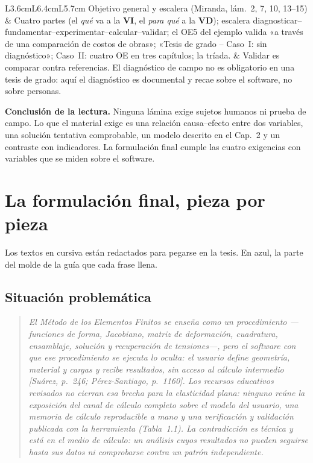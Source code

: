 \documentclass[11pt,a4paper]{article}
\newcommand{\vi}{\textbf{VI}}
\newcommand{\vd}{\textbf{VD}}
\newcommand{\molde}[1]{\textcolor{blue!60!black}{\small #1}}
\newcommand{\pegar}[1]{\begin{quote}\itshape #1\end{quote}}
\begin{document}
{\begin{longtable}{L{3.6cm}L{6.4cm}L{5.7cm}}
Objetivo general y escalera (Miranda, lám.~2, 7, 10, 13--15) & Cuatro partes (el \emph{qué} va a la \vi, el \emph{para qué} a la \vd); escalera diagnosticar--fundamentar--experimentar--calcular--validar; el OE5 del ejemplo valida «a través de una comparación de costos de obras»; «Tesis de grado -- Caso~I: sin diagnóstico»; Caso~II: cuatro OE en tres capítulos; la tríada. & Validar es comparar contra referencias. El diagnóstico de campo no es obligatorio en una tesis de grado: aquí el diagnóstico es documental y recae sobre el software, no sobre personas. \\
\bottomrule
\end{longtable}}

\textbf{Conclusión de la lectura.} Ninguna lámina exige sujetos humanos ni prueba de campo. Lo que el material exige es una relación causa--efecto entre dos variables, una solución tentativa comprobable, un modelo descrito en el Cap.~2 y un contraste con indicadores. La formulación final cumple las cuatro exigencias con variables que se miden sobre el software.

\section{La formulación final, pieza por pieza}
\label{sec:formulacion}

Los textos en cursiva están redactados para pegarse en la tesis. \molde{En azul, la parte del molde de la guía que cada frase llena.}

\subsection{Situación problemática}

\pegar{El Método de los Elementos Finitos se enseña como un procedimiento —funciones de forma, Jacobiano, matriz de deformación, cuadratura, ensamblaje, solución y recuperación de tensiones—, pero el software con que ese procedimiento se ejecuta lo oculta: el usuario define geometría, material y cargas y recibe resultados, sin acceso al cálculo intermedio [Suárez, p.~246; Pérez-Santiago, p.~1160]. Los recursos educativos revisados no cierran esa brecha para la elasticidad plana: ninguno reúne la exposición del canal de cálculo completo sobre el modelo del usuario, una memoria de cálculo reproducible a mano y una verificación y validación publicada con la herramienta (Tabla~1.1). La contradicción es técnica y está en el medio de cálculo: un análisis cuyos resultados no pueden seguirse hasta sus datos ni comprobarse contra un patrón independiente.}
\end{document}
